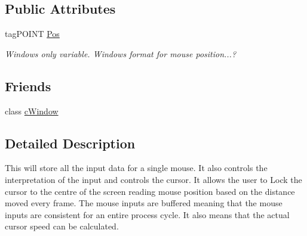 \subsection*{Public Attributes}
\begin{DoxyCompactItemize}
\item 
\hypertarget{classc_mouse_ad6306d52aba6df1e6496c038db013442}{
tagPOINT \hyperlink{classc_mouse_ad6306d52aba6df1e6496c038db013442}{Pos}}
\label{classc_mouse_ad6306d52aba6df1e6496c038db013442}

\begin{DoxyCompactList}\small\item\em Windows only variable. Windows format for mouse position...? \end{DoxyCompactList}\end{DoxyCompactItemize}
\subsection*{Friends}
\begin{DoxyCompactItemize}
\item 
\hypertarget{classc_mouse_a1e015f676ddfb09a249d209e2fbac01c}{
class \hyperlink{classc_mouse_a1e015f676ddfb09a249d209e2fbac01c}{cWindow}}
\label{classc_mouse_a1e015f676ddfb09a249d209e2fbac01c}

\end{DoxyCompactItemize}


\subsection{Detailed Description}
This will store all the input data for a single mouse. It also controls the interpretation of the input and controls the cursor. It allows the user to Lock the cursor to the centre of the screen reading mouse position based on the distance moved every frame. The mouse inputs are buffered meaning that the mouse inputs are consistent for an entire process cycle. It also means that the actual cursor speed can be calculated. 